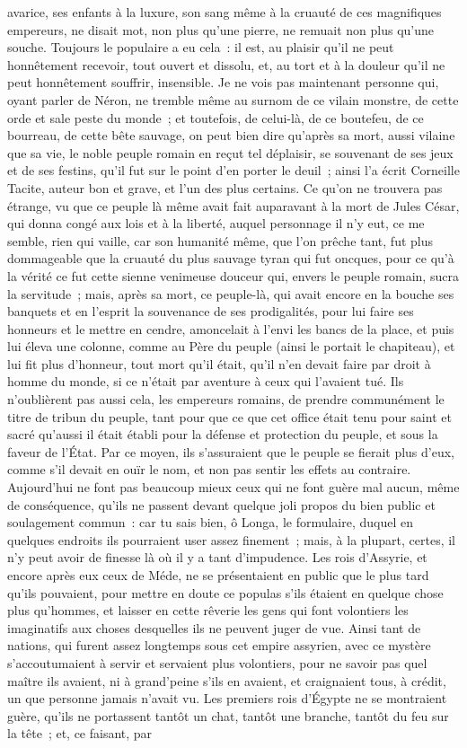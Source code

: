 \documentclass[french,twoside]{book} %
\begin{document}
avarice, ses enfants à la luxure, son sang même à la cruauté de ces magnifiques empereurs, ne disait mot, non plus qu’une pierre, ne remuait non plus qu’une souche. Toujours le populaire a eu cela : il est, au plaisir qu’il ne peut honnêtement recevoir, tout ouvert et dissolu, et, au tort et à la douleur qu’il ne peut honnêtement souffrir, insensible. Je ne vois pas maintenant personne qui, oyant parler de Néron, ne tremble même au surnom de ce vilain monstre, de cette orde et sale peste du monde ; et toutefois, de celui-là, de ce boutefeu, de ce bourreau, de cette bête sauvage, on peut bien dire qu’après sa mort, aussi vilaine que sa vie, le noble peuple romain en reçut tel déplaisir, se souvenant de ses jeux et de ses festins, qu’il fut sur le point d’en porter le deuil ; ainsi l’a écrit Corneille Tacite, auteur bon et grave, et l’un des plus certains. Ce qu’on ne trouvera pas étrange, vu que ce peuple là même avait fait auparavant à la mort de Jules César, qui donna congé aux lois et à la liberté, auquel personnage il n’y eut, ce me semble, rien qui vaille, car son humanité même, que l’on prêche tant, fut plus dommageable que la cruauté du plus sauvage tyran qui fut oncques, pour ce qu’à la vérité ce fut cette sienne venimeuse douceur qui, envers le peuple romain, sucra la servitude ; mais, après sa mort, ce peuple-là, qui avait encore en la bouche ses banquets et en l’esprit la souvenance de ses prodigalités, pour lui faire ses honneurs et le mettre en cendre, amoncelait à l’envi les bancs de la place, et puis lui éleva une colonne, comme au Père du peuple (ainsi le portait le chapiteau), et lui fit plus d’honneur, tout mort qu’il était, qu’il n’en devait faire par droit à homme du monde, si ce n’était par aventure à ceux qui l’avaient tué. Ils n’oublièrent pas aussi cela, les empereurs romains, de prendre communément le titre de tribun du peuple, tant pour que ce que cet office était tenu pour saint et sacré qu’aussi il était établi pour la défense et protection du peuple, et sous la faveur de l’État. Par ce moyen, ils s’assuraient que le peuple se fierait plus d’eux, comme s’il devait en ouïr le nom, et non pas sentir les effets au contraire. Aujourd’hui ne font pas beaucoup mieux ceux qui ne font guère mal aucun, même de conséquence, qu’ils ne passent devant quelque joli propos du bien public et soulagement commun : car tu sais bien, ô Longa, le formulaire, duquel en quelques endroits ils pourraient user assez finement ; mais, à la plupart, certes, il n’y peut avoir de finesse là où il y a tant d’impudence. Les rois d’Assyrie, et encore après eux ceux de Méde, ne se présentaient en public que le plus tard qu’ils pouvaient, pour mettre en doute ce populas s’ils étaient en quelque chose plus qu’hommes, et laisser en cette rêverie les gens qui font volontiers les imaginatifs aux choses desquelles ils ne peuvent juger de vue. Ainsi tant de nations, qui furent assez longtemps sous cet empire assyrien, avec ce mystère s’accoutumaient à servir et servaient plus volontiers, pour ne savoir pas quel maître ils avaient, ni à grand’peine s’ils en avaient, et craignaient tous, à crédit, un que personne jamais n’avait vu. Les premiers rois d’Égypte ne se montraient guère, qu’ils ne portassent tantôt un chat, tantôt une branche, tantôt du feu sur la tête ; et, ce faisant, par 
\end{document}
